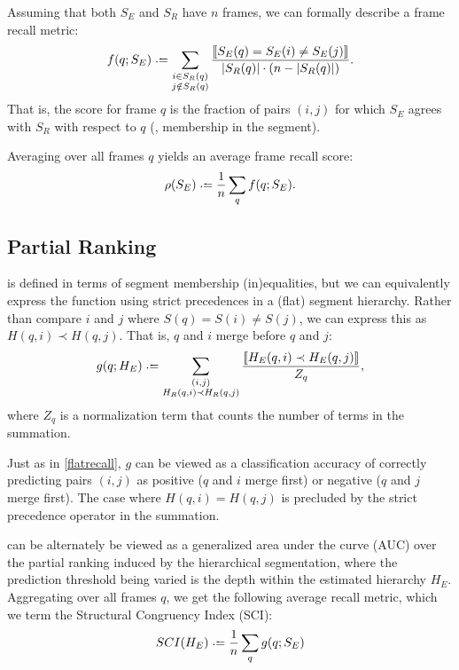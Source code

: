 \documentclass{article}
\begin{document}
Assuming that both $S_E$ and $S_R$ have $n$ frames, we can formally describe a frame
recall metric:
\begin{equation}
f(q ; S_E) \defeq 
\sum_{\substack{i \in S_R(q)\\ j \notin S_R(q)}}
\frac{\ind{S_E(q) = S_E(i) \neq S_E(j) }}{|S_R(q)|\cdot (n -
|S_R(q)|)}.\label{flatrecall}
\end{equation}
That is, the score for frame $q$ is the fraction of pairs $(i, j)$ for which $S_E$
agrees with $S_R$ with respect to $q$ (\ie, membership in the segment).

Averaging over all frames $q$ yields an average frame recall score:
\begin{equation}
\rho(S_E) \defeq \frac{1}{n} \sum_q f(q ; S_E).\label{avgrecall}
\end{equation}
\nocite{levy2008structural}


\subsection{Partial Ranking}

 is defined in terms of segment membership (in)equalities, but 
we can equivalently express the function using strict precedences in a (flat)
segment hierarchy.
Rather than compare $i$ and $j$ where $S(q) = S(i) \neq S(j)$, we can express this as $H(q, i) \prec H(q, j)$.
That is, $q$ and $i$ merge before $q$ and $j$:
\begin{equation}
g(q ; H_E) \defeq \sum_{\substack{(i, j)\\ H_R(q, i) \prec H_R(q, j)}}
\frac{\ind{H_E(q, i) \prec H_E(q, j)}}{Z_q},\label{hierrecall}
\end{equation}
where $Z_q$ is a normalization term that counts the number of terms in the summation.

Just as in \cref{flatrecall}, $g$ can be viewed as a classification accuracy of
correctly predicting pairs $(i, j)$ as positive ($q$ and $i$ merge first) or negative
($q$ and $j$ merge first).  The case where $H(q, i) = H(q, j)$ is precluded by the
strict precedence operator in the summation.

 can be alternately be viewed as a generalized area under the curve
(AUC) over the partial ranking induced by the hierarchical segmentation, where the
prediction threshold being varied is the depth within the estimated hierarchy $H_E$.
Aggregating over all frames $q$, we get the following average recall metric, which we
term the Structural Congruency Index (SCI):
\begin{equation}
SCI(H_E) \defeq \frac{1}{n} \sum_q g(q ; S_E)
\end{equation}
\end{document}
